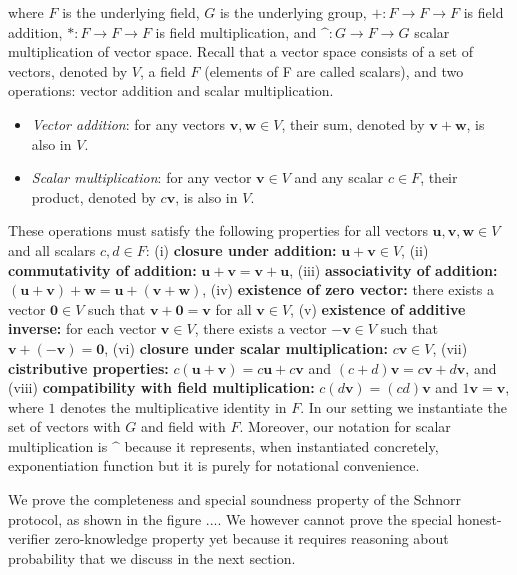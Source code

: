 \documentclass[conference,compsoc]{IEEEtran}
\begin{document}
\noindent
 where $F$ is the underlying field, $G$ is the underlying group,
 $+ : F \rightarrow F \rightarrow F$ is field addition,
 $* : F \rightarrow F \rightarrow F$ is field multiplication, and
 $\mbox{\textasciicircum}: G \rightarrow F \rightarrow G$ scalar multiplication of vector space.  
 Recall that a vector space consists of a set of 
 vectors, denoted by \(V\), a field \(F\) (elements of F are called scalars), and 
 two operations: vector addition and scalar multiplication.
\begin{itemize}
    \item \textit{Vector addition}: for any vectors \(\mathbf{v}, \mathbf{w} \in V\), their sum, denoted by \(\mathbf{v} + \mathbf{w}\), is also in \(V\).
    \item \textit{Scalar multiplication}: for any vector \(\mathbf{v} \in V\) and any scalar \(c \in F\), their product, denoted by \(c\mathbf{v}\), is also in \(V\).
\end{itemize}

These operations must satisfy the following properties for all vectors \(\mathbf{u}, \mathbf{v}, \mathbf{w} \in V\) and all scalars \(c, d \in F\):
(i) \textbf{closure under addition:} \(\mathbf{u} + \mathbf{v} \in V\), (ii) \textbf{commutativity of addition:} \(\mathbf{u} + \mathbf{v} = \mathbf{v} + \mathbf{u}\), 
(iii)  \textbf{associativity of addition:} \((\mathbf{u} + \mathbf{v}) + \mathbf{w} = \mathbf{u} + (\mathbf{v} + \mathbf{w})\), 
(iv) \textbf{existence of zero vector:} there exists a vector \(\mathbf{0} \in V\) such that \(\mathbf{v} + \mathbf{0} = \mathbf{v}\) for all \(\mathbf{v} \in V\), 
(v) \textbf{existence of additive inverse:} for each vector \(\mathbf{v} \in V\), there exists a vector \(-\mathbf{v} \in V\) such that \(\mathbf{v} + (-\mathbf{v}) = \mathbf{0}\),
(vi) \textbf{closure under scalar multiplication:} \(c\mathbf{v} \in V\), 
(vii) \textbf{cistributive properties:} \(c(\mathbf{u} + \mathbf{v}) = c\mathbf{u} + c\mathbf{v}\) and \((c + d)\mathbf{v} = c\mathbf{v} + d\mathbf{v}\), 
and (viii) \textbf{compatibility with field multiplication:} \(c(d\mathbf{v}) = (cd)\mathbf{v}\) and \(1\mathbf{v} = \mathbf{v}\), where \(1\) denotes the multiplicative identity in \(F\).
In our setting we instantiate the set of vectors with $G$ and field with $F$. 
Moreover, our notation for scalar multiplication is $\mbox{\textasciicircum}$ because it represents, 
when instantiated concretely, exponentiation function but it is purely for notational convenience. 


We prove the completeness and special soundness property of the Schnorr protocol, 
as shown in the figure .... We however cannot prove the special honest-verifier 
zero-knowledge property yet because it requires reasoning about probability that 
we discuss in the next section. 
  
\end{document}
